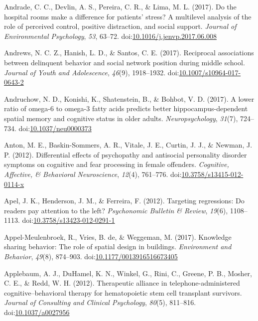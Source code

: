 \documentclass[english,man]{apa6}
\theoremstyle{definition}
\theoremstyle{definition}
\theoremstyle{definition}
\theoremstyle{remark}
\begin{document}
\hypertarget{ref-Andrade2017}{}
Andrade, C. C., Devlin, A. S., Pereira, C. R., \& Lima, M. L. (2017). Do
the hospital rooms make a difference for patients' stress? A multilevel
analysis of the role of perceived control, positive distraction, and
social support. \emph{Journal of Environmental Psychology}, \emph{53},
63--72.
doi:\href{https://doi.org/10.1016/j.jenvp.2017.06.008}{10.1016/j.jenvp.2017.06.008}

\hypertarget{ref-Andrews2017}{}
Andrews, N. C. Z., Hanish, L. D., \& Santos, C. E. (2017). Reciprocal
associations between delinquent behavior and social network position
during middle school. \emph{Journal of Youth and Adolescence},
\emph{46}(9), 1918--1932.
doi:\href{https://doi.org/10.1007/s10964-017-0643-2}{10.1007/s10964-017-0643-2}

\hypertarget{ref-Andruchow2017}{}
Andruchow, N. D., Konishi, K., Shatenstein, B., \& Bohbot, V. D. (2017).
A lower ratio of omega-6 to omega-3 fatty acids predicts better
hippocampus-dependent spatial memory and cognitive status in older
adults. \emph{Neuropsychology}, \emph{31}(7), 724--734.
doi:\href{https://doi.org/10.1037/neu0000373}{10.1037/neu0000373}

\hypertarget{ref-Anton2012}{}
Anton, M. E., Baskin-Sommers, A. R., Vitale, J. E., Curtin, J. J., \&
Newman, J. P. (2012). Differential effects of psychopathy and antisocial
personality disorder symptoms on cognitive and fear processing in female
offenders. \emph{Cognitive, Affective, \& Behavioral Neuroscience},
\emph{12}(4), 761--776.
doi:\href{https://doi.org/10.3758/s13415-012-0114-x}{10.3758/s13415-012-0114-x}

\hypertarget{ref-Apel2012}{}
Apel, J. K., Henderson, J. M., \& Ferreira, F. (2012). Targeting
regressions: Do readers pay attention to the left? \emph{Psychonomic
Bulletin \& Review}, \emph{19}(6), 1108--1113.
doi:\href{https://doi.org/10.3758/s13423-012-0291-1}{10.3758/s13423-012-0291-1}

\hypertarget{ref-Appel-Meulenbroek2017}{}
Appel-Meulenbroek, R., Vries, B. de, \& Weggeman, M. (2017). Knowledge
sharing behavior: The role of spatial design in buildings.
\emph{Environment and Behavior}, \emph{49}(8), 874--903.
doi:\href{https://doi.org/10.1177/0013916516673405}{10.1177/0013916516673405}

\hypertarget{ref-Applebaum2012}{}
Applebaum, A. J., DuHamel, K. N., Winkel, G., Rini, C., Greene, P. B.,
Mosher, C. E., \& Redd, W. H. (2012). Therapeutic alliance in
telephone-administered cognitive--behavioral therapy for hematopoietic
stem cell transplant survivors. \emph{Journal of Consulting and Clinical
Psychology}, \emph{80}(5), 811--816.
doi:\href{https://doi.org/10.1037/a0027956}{10.1037/a0027956}
\end{document}
